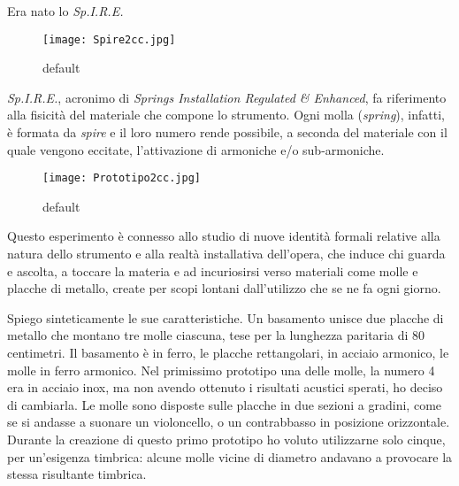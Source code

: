 Era nato lo \textit{Sp.I.R.E.}


\begin{figure}[htbp]
\begin{center}
\texttt{[image: Spire2cc.jpg]}
\caption{default}
\label{default}
\end{center}
\end{figure}

\textit{Sp.I.R.E.}, acronimo di \textit{Springs Installation Regulated \& Enhanced}, fa riferimento alla fisicità del materiale che compone lo strumento. Ogni molla (\textit{spring}), infatti, è formata da \textit{spire} e il loro numero rende possibile, a seconda del materiale con il quale vengono eccitate, l'attivazione di armoniche e/o sub-armoniche.


\begin{figure}[htbp]
\begin{center}
\texttt{[image: Prototipo2cc.jpg]}
\caption{default}
\label{default}
\end{center}
\end{figure}

Questo esperimento è connesso allo studio di nuove identità formali relative alla natura dello strumento e alla realtà installativa dell'opera, che induce chi guarda e ascolta, a toccare la materia e ad incuriosirsi verso materiali come molle e placche di metallo, create per scopi lontani dall'utilizzo che se ne fa ogni giorno.

Spiego sinteticamente le sue caratteristiche. Un basamento unisce due placche di metallo che montano tre molle ciascuna, tese per la lunghezza paritaria di 80 centimetri. Il basamento è in ferro, le placche rettangolari, in acciaio armonico, le molle in ferro armonico. Nel primissimo prototipo una delle molle, la numero 4 era in acciaio inox, ma non avendo ottenuto i risultati acustici sperati, ho deciso di cambiarla. Le molle sono disposte sulle placche in due sezioni a gradini, come se si andasse a suonare un violoncello, o un contrabbasso in posizione orizzontale. Durante la creazione di questo primo prototipo ho voluto utilizzarne solo cinque, per un'esigenza timbrica: alcune molle vicine di diametro andavano a provocare la stessa risultante timbrica.

